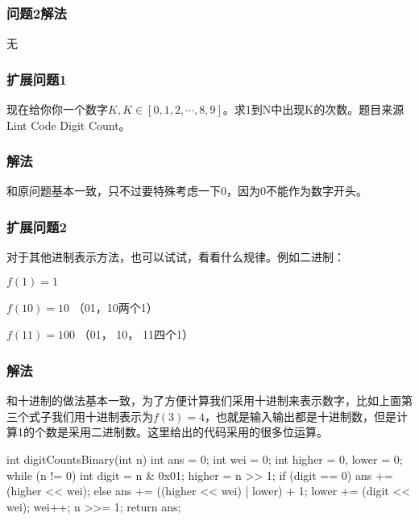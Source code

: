 \subsubsection{问题2解法}
无

\subsubsection{扩展问题1}
现在给你你一个数字$K, K \in [0, 1, 2, \cdots , 8, 9]$。求1到N中出现K的次数。题目来源 Lint Code Digit Count。

\subsubsection{解法}
和原问题基本一致，只不过要特殊考虑一下0，因为0不能作为数字开头。

\subsubsection{扩展问题2}
对于其他进制表示方法，也可以试试，看看什么规律。例如二进制：

$f(1) = 1$

$f(10) = 10$ （01，10两个1）

$f(11) = 100$ （01， 10， 11四个1）


\subsubsection{解法}
和十进制的做法基本一致，为了方便计算我们采用十进制来表示数字，比如上面第三个式子我们用十进制表示为$f(3) = 4$，也就是输入输出都是十进制数，但是计算1的个数是采用二进制数。这里给出的代码采用的很多位运算。
\begin{Codex}[label={[$O(lg(N))+O(1)$]Chap02_04_Ones.java}]
int digitCountsBinary(int n) {
    int ans = 0;
    int wei = 0;
    int higher = 0, lower = 0;
    while (n != 0) {
        int digit = n & 0x01;
        higher = n >> 1;
        if (digit == 0) {
            ans += (higher << wei);
        } else {
        ans += ((higher << wei) | lower) + 1;
        }
        lower += (digit << wei);
        wei++;
        n >>= 1;
    }
    return ans;
}
\end{Codex}

